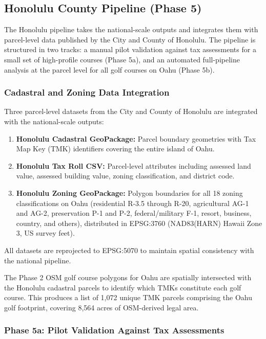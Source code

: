 \documentclass[11pt, letterpaper]{article}
\begin{document}
\subsection{Honolulu County Pipeline (Phase 5)}

The Honolulu pipeline takes the national-scale outputs and integrates them with parcel-level data published by the City and County of Honolulu. The pipeline is structured in two tracks: a manual pilot validation against tax assessments for a small set of high-profile courses (Phase 5a), and an automated full-pipeline analysis at the parcel level for all golf courses on Oahu (Phase 5b).

\subsubsection{Cadastral and Zoning Data Integration}

Three parcel-level datasets from the City and County of Honolulu are integrated with the national-scale outputs:

\begin{enumerate}[leftmargin=*]
    \item \textbf{Honolulu Cadastral GeoPackage:} Parcel boundary geometries with Tax Map Key (TMK) identifiers covering the entire island of Oahu.
    \item \textbf{Honolulu Tax Roll CSV:} Parcel-level attributes including assessed land value, assessed building value, zoning classification, and district code.
    \item \textbf{Honolulu Zoning GeoPackage:} Polygon boundaries for all 18 zoning classifications on Oahu (residential R-3.5 through R-20, agricultural AG-1 and AG-2, preservation P-1 and P-2, federal/military F-1, resort, business, country, and others), distributed in EPSG:3760 (NAD83(HARN) Hawaii Zone 3, US survey feet).
\end{enumerate}

\noindent All datasets are reprojected to EPSG:5070 to maintain spatial consistency with the national pipeline.

The Phase 2 OSM golf course polygons for Oahu are spatially intersected with the Honolulu cadastral parcels to identify which TMKs constitute each golf course. This produces a list of 1,072 unique TMK parcels comprising the Oahu golf footprint, covering 8,564 acres of OSM-derived legal area.

\subsubsection{Phase 5a: Pilot Validation Against Tax Assessments}
\end{document}
